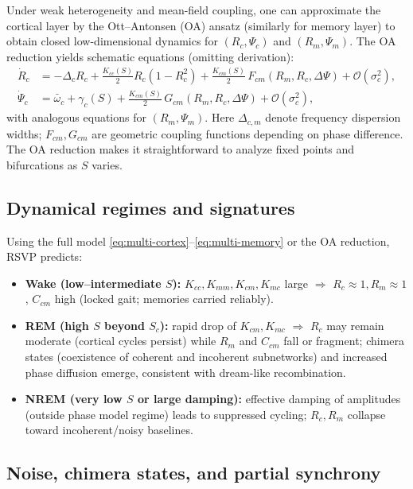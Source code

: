 \documentclass{article}
\begin{document}
Under weak heterogeneity and mean-field coupling, one can approximate the cortical layer by the Ott–Antonsen (OA) ansatz (similarly for memory layer) to obtain closed low-dimensional dynamics for $(R_c,\Psi_c)$ and $(R_m,\Psi_m)$. The OA reduction yields schematic equations (omitting derivation):
\begin{align}
\dot R_c &= -\Delta_c R_c + \tfrac{K_{cc}(S)}{2} R_c (1-R_c^2) + \tfrac{K_{cm}(S)}{2}\,F_{cm}(R_m,R_c,\Delta\Psi) + \mathcal{O}(\sigma_c^2),\\
\dot \Psi_c &= \bar\omega_c + \gamma_c(S) + \tfrac{K_{cm}(S)}{2}\,G_{cm}(R_m,R_c,\Delta\Psi) + \mathcal{O}(\sigma_c^2),
\end{align}
with analogous equations for $(R_m,\Psi_m)$. Here $\Delta_{c,m}$ denote frequency dispersion widths; $F_{cm},G_{cm}$ are geometric coupling functions depending on phase difference. The OA reduction makes it straightforward to analyze fixed points and bifurcations as $S$ varies.

\subsection{Dynamical regimes and signatures}

Using the full model \eqref{eq:multi-cortex}--\eqref{eq:multi-memory} or the OA reduction, RSVP predicts:
\begin{itemize}
  \item \textbf{Wake (low--intermediate $S$):} $K_{cc},K_{mm},K_{cm},K_{mc}$ large $\Rightarrow$ $R_c\approx 1,R_m\approx 1$, $C_{cm}$ high (locked gait; memories carried reliably).
  \item \textbf{REM (high $S$ beyond $S_c$):} rapid drop of $K_{cm},K_{mc}$ $\Rightarrow$ $R_c$ may remain moderate (cortical cycles persist) while $R_m$ and $C_{cm}$ fall or fragment; chimera states (coexistence of coherent and incoherent subnetworks) and increased phase diffusion emerge, consistent with dream-like recombination.
  \item \textbf{NREM (very low $S$ or large damping):} effective damping of amplitudes (outside phase model regime) leads to suppressed cycling; $R_c,R_m$ collapse toward incoherent/noisy baselines.
\end{itemize}

\subsection{Noise, chimera states, and partial synchrony}
\end{document}
